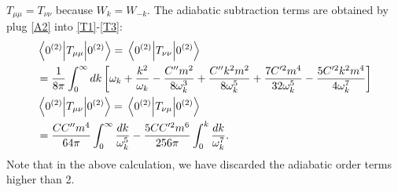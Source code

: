 \documentclass[12pt]{article}
\numberwithin{equation}{section}
\theoremstyle{1style}
\begin{document}
\(T_{\mu\mu}=T_{\nu\nu}\) because \(W_k=W_{-k}\).
The adiabatic subtraction terms are obtained by plug \ref{A2} into \ref{T1}-\ref{T3}:
\begin{align}
  &\expval{T_{\mu\mu}}{0^{(2)}}=\expval{T_{\nu\nu}}{0^{(2)}}\\\label{T1}
  &=\frac{1}{8\pi}\int_{0}^{\infty}dk\left[\omega_k+\frac{k^2}{\omega_k}-\frac{C''m^2}{8\omega_k^3}+\frac{C''k^2m^2}{8\omega_k^5}+\frac{7C'^2m^4}{32\omega^5_k}-\frac{5C'^2k^2m^4}{4\omega_k^7}\right]\\
  &\expval{T_{\mu\nu}}{0^{(2)}}=\expval{T_{\nu\mu}}{0^{(2)}}\\
  &=\frac{CC''m^4}{64\pi}\int^{\infty}_{0}\frac{dk}{\omega_k^5}-\frac{5CC'^2m^6}{256\pi}\int^{k}_0\frac{dk}{\omega_k^7}.\label{T3}
\end{align}
Note that in the above calculation, we have discarded the adiabatic order terms higher than 2.
\end{document}
